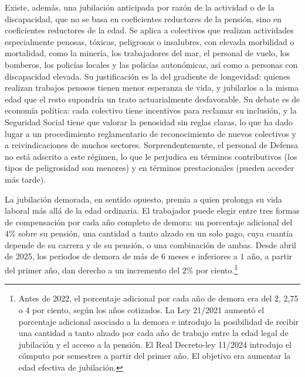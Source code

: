 \documentclass[10pt,a4paper]{article}
\begin{document}
Existe, además, una jubilación anticipada por razón de la actividad o de la discapacidad, que no se basa en coeficientes reductores de la pensión, sino en coeficientes reductores de la edad. Se aplica a colectivos que realizan actividades especialmente penosas, tóxicas, peligrosas o insalubres, con elevada morbilidad o mortalidad, como la minería, los trabajadores del mar, el personal de vuelo, los bomberos, los policías locales y las policías autonómicas, así como a personas con discapacidad elevada. Su justificación es la del gradiente de longevidad: quienes realizan trabajos penosos tienen menor esperanza de vida, y jubilarlos a la misma edad que el resto supondría un trato actuarialmente desfavorable. Su debate es de economía política: cada colectivo tiene incentivos para reclamar su inclusión, y la Seguridad Social tiene que valorar la penosidad sin reglas claras, lo que ha dado lugar a un procedimiento reglamentario de reconocimiento de nuevos colectivos y a reivindicaciones de muchos sectores. Sorprendentemente, el personal de Defensa no está adscrito a este régimen, lo que le perjudica en términos contributivos (los tipos de peligrosidad son menores) y en términos prestacionales (pueden acceder más tarde).

La jubilación demorada, en sentido opuesto, premia a quien prolonga su vida laboral más allá de la edad ordinaria. El trabajador puede elegir entre tres formas de compensación por cada año completo de demora: un porcentaje adicional del $4\%$ sobre su pensión, una cantidad a tanto alzado en un solo pago, cuya cuantía depende de su carrera y de su pensión, o una combinación de ambas. Desde abril de 2025, los periodos de demora de más de $6$ meses e inferiores a $1$ año, a partir del primer año, dan derecho a un incremento del $2\%$ por ciento.\footnote{%
    Antes de 2022, el porcentaje adicional por cada año de demora era del 2, 2,75 o 4 por ciento, según los años cotizados. La Ley 21/2021 aumentó el porcentaje adicional asociado a la demora e introdujo la posibilidad de recibir una cantidad a tanto alzado por cada año de trabajo entre la edad legal de jubilación y el acceso a la pensión. El Real Decreto-ley 11/2024 introdujo el cómputo por semestres a partir del primer año. El objetivo era aumentar la edad efectiva de jubilación.
}
\end{document}
